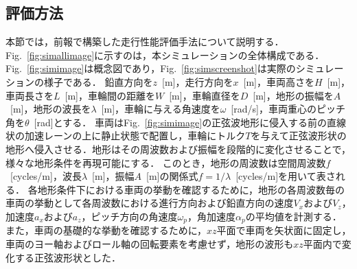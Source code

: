 \documentclass[uplatex,dvipdfmx]{jsarticle}
\begin{document}
\subsection{評価方法}
本節では，前報で構築した走行性能評価手法について説明する．
Fig.~\ref{fig:simallimage}に示すのは，本シミュレーションの全体構成である．
Fig.~\ref{fig:simimage}は概念図であり，Fig.~\ref{fig:simscreenshot}は実際のシミュレーションの様子である．
鉛直方向を$z$~[m]，走行方向を$x$~[m]，車両高さを$H$~[m]，車両長さを$L$~[m]，車輪間の距離を$W$~[m]，車輪直径を$D$~[m]，地形の振幅を$A$~[m]，地形の波長を$\lambda$~[m]，車輪に与える角速度を$\omega$~[rad/s]，車両重心のピッチ角を$\theta$~[rad]とする．
車両はFig.~\ref{fig:simimage}の正弦波地形に侵入する前の直線状の加速レーンの上に静止状態で配置し，車輪にトルク$T$を与えて正弦波形状の地形へ侵入させる．地形はその周波数および振幅を段階的に変化させることで，様々な地形条件を再現可能にする．
このとき，地形の周波数は空間周波数$f$~[cycles/m]，波長$\lambda$~[m]，振幅$A$~[m]の関係式$f=1/\lambda$~[cycles/m]を用いて表される．
各地形条件下における車両の挙動を確認するために，地形の各周波数毎の車両の挙動として各周波数における進行方向および鉛直方向の速度$V_{\mathit{x}}$および$V_{\mathit{z}}$，加速度$a_{\mathit{x}}$および$a_{\mathit{z}}$，ピッチ方向の角速度$\omega_{\mathit{p}}$，角加速度$\alpha_{\mathit{p}}$の平均値を計測する．
また，車両の基礎的な挙動を確認するために，$xz$平面で車両を矢状面に固定し，車両のヨー軸およびロール軸の回転要素を考慮せず，地形の波形も$xz$平面内で変化する正弦波形状とした．
\end{document}
